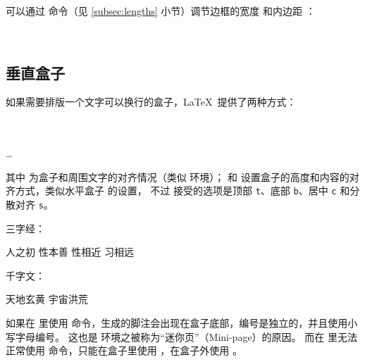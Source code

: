 可以通过  命令（见 \ref{subsec:lengths} 小节）调节边框的宽度  和内边距 ：
\begin{example}
\\[1ex]
\setlength{\fboxrule}{1.6pt}
\setlength{\fboxsep}{1em}
\end{example}

\subsection{垂直盒子}\label{subsec:parbox}

如果需要排版一个文字可以换行的盒子，\LaTeX\ 提供了两种方式：
\begin{command}
\marg*{\ldots} \\[0.5ex]
 \\
\ldots \\
\end{command}

其中  为盒子和周围文字的对齐情况（类似  环境）；
 和  设置盒子的高度和内容的对齐方式，类似水平盒子  的设置，
不过  接受的选项是顶部 \texttt{t}、底部 \texttt{b}、居中 \texttt{c} 和分散对齐 \texttt{s}。

\begin{example}
三字经：\parbox[t]{3em}%
{人之初 性本善 性相近 习相远}
\quad
千字文：
\begin{minipage}[b][8ex][t]{4em}
天地玄黄 宇宙洪荒
\end{minipage}
\end{example}

如果在  里使用  命令，生成的脚注会出现在盒子底部，编号是独立的，并且使用小写字母编号。
这也是  环境之被称为“迷你页”（Mini-page）的原因。
而在  里无法正常使用  命令，只能在盒子里使用 ，在盒子外使用 。
\begin{example}
\end{example}

